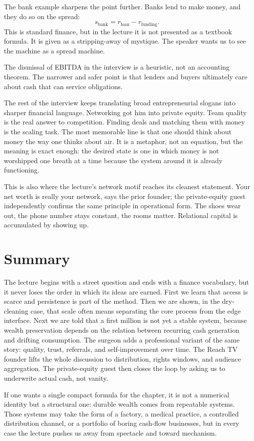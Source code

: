 The bank example sharpens the point further. Banks lend to make money, and they do so on the spread:
\begin{equation}
s_{\text{bank}} = r_{\text{loan}} - r_{\text{funding}}.
\end{equation}
This is standard finance, but in the lecture it is not presented as a textbook formula. It is given as a stripping-away of mystique. The speaker wants us to see the machine as a spread machine.

\begin{remark}
The dismissal of EBITDA in the interview is a heuristic, not an accounting theorem. The narrower and safer point is that lenders and buyers ultimately care about cash that can service obligations.
\end{remark}

The rest of the interview keeps translating broad entrepreneurial slogans into sharper financial language. Networking got him into private equity. Team quality is the real answer to competition. Finding deals and matching them with money is the scaling task. The most memorable line is that one should think about money the way one thinks about air. It is a metaphor, not an equation, but the meaning is exact enough: the desired state is one in which money is not worshipped one breath at a time because the system around it is already functioning.

This is also where the lecture's network motif reaches its cleanest statement. Your net worth is really your network, says the prior founder; the private-equity guest independently confirms the same principle in operational form. The shoes wear out, the phone number stays constant, the rooms matter. Relational capital is accumulated by showing up.

\section{Summary}

The lecture begins with a street question and ends with a finance vocabulary, but it never loses the order in which its ideas are earned. First we learn that access is scarce and persistence is part of the method. Then we are shown, in the dry-cleaning case, that scale often means separating the core process from the edge interface. Next we are told that a first million is not yet a stable system, because wealth preservation depends on the relation between recurring cash generation and drifting consumption. The surgeon adds a professional variant of the same story: quality, trust, referrals, and self-improvement over time. The Reach TV founder lifts the whole discussion to distribution, rights windows, and audience aggregation. The private-equity guest then closes the loop by asking us to underwrite actual cash, not vanity.

If one wants a single compact formula for the chapter, it is not a numerical identity but a structural one: durable wealth comes from repeatable systems. Those systems may take the form of a factory, a medical practice, a controlled distribution channel, or a portfolio of boring cash-flow businesses, but in every case the lecture pushes us away from spectacle and toward mechanism.